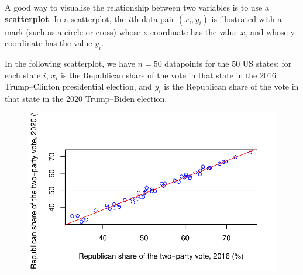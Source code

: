 \documentclass[
  letterpaper,
  DIV=11,
  numbers=noendperiod]{scrreprt}
\newenvironment{Shaded}{\begin{snugshade}}{\end{snugshade}}
\newcommand{\AttributeTok}[1]{\textcolor[rgb]{0.40,0.45,0.13}{#1}}
\newcommand{\DecValTok}[1]{\textcolor[rgb]{0.68,0.00,0.00}{#1}}
\newcommand{\FloatTok}[1]{\textcolor[rgb]{0.68,0.00,0.00}{#1}}
\newcommand{\FunctionTok}[1]{\textcolor[rgb]{0.28,0.35,0.67}{#1}}
\newcommand{\NormalTok}[1]{\textcolor[rgb]{0.00,0.23,0.31}{#1}}
\newcommand{\OtherTok}[1]{\textcolor[rgb]{0.00,0.23,0.31}{#1}}
\newcommand{\SpecialCharTok}[1]{\textcolor[rgb]{0.37,0.37,0.37}{#1}}
\newcommand{\StringTok}[1]{\textcolor[rgb]{0.13,0.47,0.30}{#1}}
\theoremstyle{remark}
\begin{document}
A good way to visualise the relationship between two variables is to use
a \textbf{scatterplot}. In a scatterplot, the \(i\)th data pair
\((x_i, y_i)\) is illustrated with a mark (such as a circle or cross)
whose x-coordinate has the value \(x_i\) and whose y-coordinate has the
value \(y_i\).

In the following scatterplot, we have \(n = 50\) datapoints for the 50
US states; for each state \(i\), \(x_i\) is the Republican share of the
vote in that state in the 2016 Trump--Clinton presidential election, and
\(y_i\) is the Republican share of the vote in that state in the 2020
Trump--Biden election.

\begin{Shaded}
\end{Shaded}

\begin{figure}[H]

{\centering \includegraphics{sections/L02-dataviz_files/figure-pdf/elections-1.pdf}

}

\end{figure}
\end{document}
